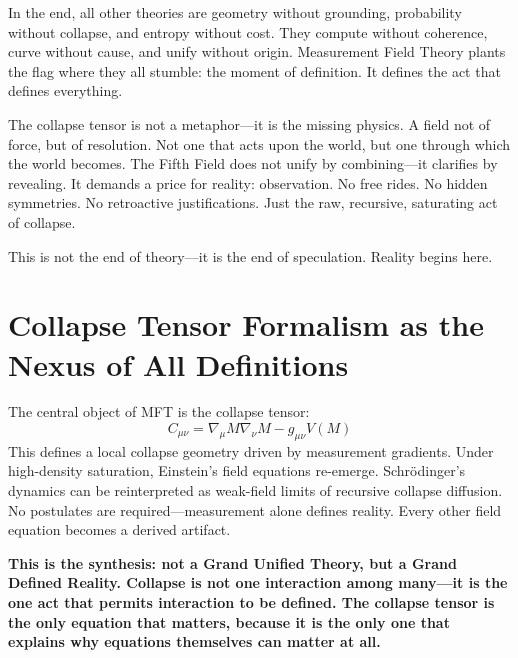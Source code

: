 In the end, all other theories are geometry without grounding, probability without collapse, and entropy without cost. They compute without coherence, curve without cause, and unify without origin. Measurement Field Theory plants the flag where they all stumble: the moment of definition. It defines the act that defines everything.

The collapse tensor is not a metaphor—it is the missing physics. A field not of force, but of resolution. Not one that acts upon the world, but one through which the world becomes. The Fifth Field does not unify by combining—it clarifies by revealing. It demands a price for reality: observation. No free rides. No hidden symmetries. No retroactive justifications. Just the raw, recursive, saturating act of collapse.

This is not the end of theory—it is the end of speculation. Reality begins here.

\section{Collapse Tensor Formalism as the Nexus of All Definitions}
The central object of MFT is the collapse tensor:
\[
C_{\mu\nu} = \nabla_\mu M \nabla_\nu M - g_{\mu\nu} V(M)
\]
This defines a local collapse geometry driven by measurement gradients. Under high-density saturation, Einstein’s field equations re-emerge. Schrödinger’s dynamics can be reinterpreted as weak-field limits of recursive collapse diffusion. No postulates are required—measurement alone defines reality. Every other field equation becomes a derived artifact.

\textbf{This is the synthesis: not a Grand Unified Theory, but a Grand Defined Reality. Collapse is not one interaction among many—it is the one act that permits interaction to be defined. The collapse tensor is the only equation that matters, because it is the only one that explains why equations themselves can matter at all.}
